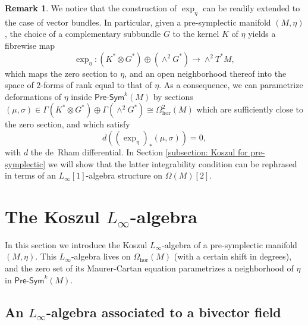 \documentclass[11pt,thmsa]{amsart}
\theoremstyle{definition}
\newtheorem{remark}[theorem]{Remark}
\newcommand{\Presym}{\mathsf{Pre}\textrm{-}\mathsf{Sym}}
\newcommand{\hor}{\mathrm{hor}}
\newcommand{\lione}{$L_{\infty}[1]$-algebra }
\begin{document}
\begin{remark}\label{rem:parametrize}
We notice that the construction of $\exp_{\eta}$ can be readily extended to the case of vector bundles. In particular, given a pre-symplectic manifold $(M,\eta)$, the choice of a complementary subbundle $G$
to the kernel $K$ of $\eta$ yields a fibrewise map
$$\exp_{\eta}: (K^*\otimes G^*)\oplus (\wedge^2 G^*) \to \wedge^2 T^*M,$$
which maps the zero section to $\eta$, and an open neighborhood thereof into the space of $2$-forms of rank equal to that of $\eta$.
As a consequence, we can parametrize deformations of $\eta$
inside $\Presym^k(M)$
by sections $(\mu, \sigma)\in \Gamma(K^*\otimes G^*)\oplus \Gamma(\wedge^2 G^*) \cong \Omega_\hor^2(M)$ which are sufficiently close
to the zero section, and which satisfy
$$d ((\exp_{\eta})_*(\mu,\sigma))=0,$$
with $d$ the de~Rham differential.
In Section \ref{subsection: Koszul for pre-symplectic} we will show that the latter integrability condition can be rephrased in terms of an \lione structure on $\Omega(M)[2]$.
\end{remark}



 

\section{\textsf{The Koszul $L_\infty$-algebra}}\label{section: Koszul Lie 3-algebra}

In this section we introduce the Koszul $L_\infty$-algebra
of a pre-symplectic manifold $(M,\eta)$. This $L_\infty$-algebra lives on $\Omega_\hor(M)$ (with a certain shift in degrees),
and the zero set of its Maurer-Cartan equation parametrizes a neighborhood of $\eta$ in $\Presym^k(M)$.


\subsection{An $L_\infty$-algebra associated to a bivector field}
\label{subsection: Koszul for bivectors}
\end{document}
